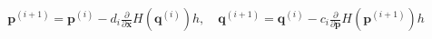 \documentclass[preview]{standalone}
\begin{document}
\begin{align*}
\mathbf p^{(i+1)}=\mathbf p^{(i)}-d_i\frac{\partial}{\partial\mathbf x}H(\mathbf q^{(i)})h , \quad \mathbf q^{(i+1)}=\mathbf q^{(i)}-c_i\frac{\partial}{\partial\mathbf p}H(\mathbf p^{(i+1)})h
\end{align*}
\end{document}
